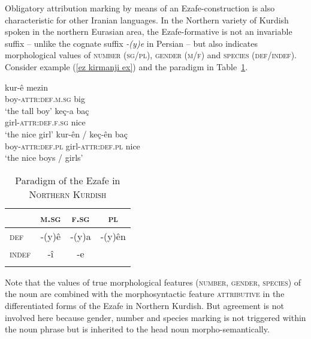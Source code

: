 Obligatory attribution marking by means of an Ezafe-construction is also characteristic for other Iranian languages. In the Northern variety of Kurdish spoken in the northern Eurasian area, the Ezafe-formative is not an invariable suffix – unlike the cognate suffix \textit{-(y)e} in Persian – but also indicates morphological values of \textsc{number} (\textsc{sg\slash{}pl}), \textsc{gender} (\textsc{m\slash{}f}) and \textsc{species} (\textsc{def\slash{}indef}). Consider example (\ref{ez kirmanji ex}) and the paradigm in Table~\ref{ez kirmanji paradigm}. 
\begin{exe}
\ex
{} \label{ez kirmanji ex}
\begin{xlist}
\ex
\gll	kur-\^e mezin\\
	boy-\textsc{attr:def.m.sg} big\\
\glt	‘the tall boy’
\ex	
\gll	ke\c{c}-a ba\c{c}\\
	girl-\textsc{attr:def.f.sg} nice\\
\glt	‘the nice girl’
\ex	
\gll	kur-\^en / ke\c{c}-\^en ba\c{c}\\
	boy-\textsc{attr:def.pl} {} girl-\textsc{attr:def.pl} nice\\
\glt	‘the nice boys / girls’
\end{xlist}
\end{exe}
\begin{table}
\begin{tabular}{lccc}
\lsptoprule
		&\textsc{m.sg}	&\textsc{f.sg}		&\textsc{pl}\\
\midrule
\textsc{def}	&-(y)\^{e}	&-(y)a			&-(y)\^{e}n\\
\textsc{indef}	&-î		&-e				&\\
\lspbottomrule
\end{tabular}
\caption[Paradigm of the Ezafe in \textsc{Northern Kurdish}]{Paradigm of the Ezafe in \textsc{Northern Kurdish} \citep{schroder2002}} 
\label{ez kirmanji paradigm}
\end{table}
Note that the values of true morphological features (\textsc{number, gender, species}) of the noun are combined with the morphosyntactic feature \textsc{attributive} in the differentiated forms of the Ezafe in Northern Kurdish. But agreement is not involved here because gender, number and species marking is not triggered within the noun phrase but is inherited to the head noun morpho-semantically.


